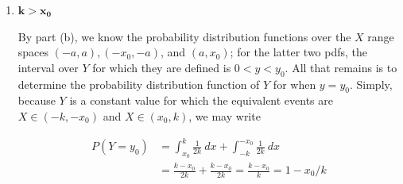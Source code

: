 \documentclass[10pt, oneside]{article}
\begin{document}
\begin{enumerate}[label=5.\arabic*]
\begin{enumerate}
	Lastly, we drive $G(y)$ over the $X$ interval $(a, k)$:
	
	\begin{align*}
	G(y) = P(Y \leq y) &= P \Big(\frac{y_0}{x_0 - a} X - \frac{ay_0}{x_0 - a} \leq y \Big) \\
	&= P\Big(X \leq \Big( \frac{x_0 - a}{y_0} \Big) y - a \Big) \\
	&=  \int^{(\frac{x_0 - a}{y_0}) y - a}_a \frac{1}{2k} \ dx = \frac{(x_0 - a) y}{2ky_0} - \frac{a}{k}
	\end{align*}
	
	Then $G'(y) = g(y) = \boxed{ \frac{x_0 - a}{2ky_0} , 0 < y < \frac{y_0 (k - a)}{x_0 - a}}$. Since both events $X \in (-k, -a)$ and $X \in (a, k)$ are equivalent to $Y \in (0, y)$, we need only sum the corresponding probability distribution functions of $Y$ over those respective intervals. In particular, we have:
	
	\begin{align*}
	g(y) = \frac{d}{dy}G(y) &= \frac{d}{dy} \Bigg[ \int^{-a}_{-(\frac{x_0 - a}{y_0}) y - a} \frac{1}{2k} \ dx +  \int^{(\frac{x_0 - a}{y_0}) y - a}_a \frac{1}{2k} \ dx \Bigg] \\
	&= \frac{x_0 - a}{ky_0}, 0 < y < \frac{y_0 (k - a)}{x_0 - a}
	\end{align*}
	
	Namely, we can conclude that $\boxed{ g(y) = \frac{x_0 - a}{ky_0}, 0 < y < \frac{y_0 (k - a)}{x_0 - a}}$ and $\boxed{g(y) = \frac{a}{k}, y = 0}$.
	
	\item  \begin{tcolorbox}[
	  colback=Cerulean!5!white,
	  colframe=Cerulean!75!black]
	\textbf{$\bm{k > x_0}$}
	\end{tcolorbox}
	
	By part (b), we know the probability distribution functions over the $X$ range spaces $(-a,a), (-x_0, -a)$, and $(a, x_0)$; for the latter two pdfs, the interval over $Y$ for which they are defined is $0 < y < y_0$. All that remains is to determine the probability distribution function of $Y$ for when $y = y_0$. Simply, because $Y$ is a constant value for which the equivalent events are $X \in (-k, -x_0)$ and $X \in (x_0, k)$, we may write
	
	\begin{align*}
	P(Y = y_0) &= \int^k_{x_0} \frac{1}{2k} \ dx + \int^{-x_0}_{-k} \frac{1}{2k} \ dx \\
	&= \frac{k - x_0}{2k} + \frac{k - x_0}{2k} = \frac{k - x_0}{k} = 1 - x_0 / k
	\end{align*}
	

\end{enumerate}
\end{enumerate}
\end{document}
